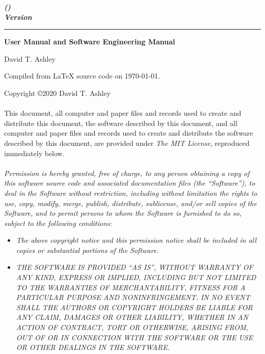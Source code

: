 \thispagestyle{empty}

\begin{flushright}
\vspace*{0mm}
\Huge\bfseries
\emph{\productbasenamelong{} (\productbasenameshort{})}\\
\emph{Version \productversion{}}\\
\end{flushright}
\vspace{0.0cm}
\noindent\rule{\textwidth}{2pt}
\begin{flushright}
\huge\bfseries
User Manual and Software Engineering Manual
\end{flushright}
\vfill
\begin{flushright}
\begin{small}
David T. Ashley
\end{small}
\end{flushright}
\vspace{0.2cm}
\begin{flushright}
\begin{small}
Compiled from \LaTeX{} source code on \today .  
\end{small}
\end{flushright}

\pagebreak
\thispagestyle{empty}
\begin{small}
\noindent{}Copyright \copyright 2020 David T. Ashley\\\\
\noindent{}This document, all computer and paper files and records used to create and
distribute this document, the software described by this document, and all computer
and paper files and records used to create and distribute the software described by
this document, are provided under \emph{The MIT License}, reproduced immediately below.\\\\
\noindent{}\emph{Permission is hereby granted, free of charge, to any person obtaining a copy
of this software source code and associated documentation files (the
``Software''), to deal in the Software without restriction, including without
limitation the rights to use, copy, modify, merge, publish, distribute,
sublicense, and/or sell copies of the Software, and to permit persons to whom
the Software is furnished to do so, subject to the following conditions:}

\begin{itemize}
\item \emph{The above copyright notice and this permission notice shall be included in
      all copies or substantial portions of the Software.}
\item \emph{THE SOFTWARE IS PROVIDED ``AS IS'', WITHOUT WARRANTY OF ANY KIND, EXPRESS OR
      IMPLIED, INCLUDING BUT NOT LIMITED TO THE WARRANTIES OF MERCHANTABILITY,
      FITNESS FOR A PARTICULAR PURPOSE AND NONINFRINGEMENT\@. IN NO EVENT SHALL THE
      AUTHORS OR COPYRIGHT HOLDERS BE LIABLE FOR ANY CLAIM, DAMAGES OR OTHER
      LIABILITY, WHETHER IN AN ACTION OF CONTRACT, TORT OR OTHERWISE, ARISING FROM,
      OUT OF OR IN CONNECTION WITH THE SOFTWARE OR THE USE OR OTHER DEALINGS IN
      THE SOFTWARE.}
\end{itemize}
\end{small}

\vfill

